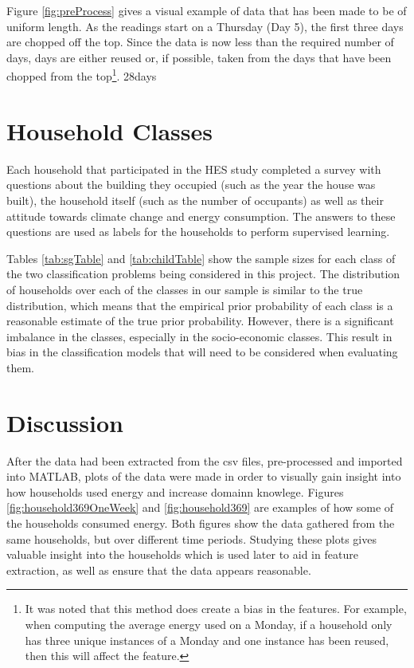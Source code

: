 Figure \ref{fig:preProcess} gives a visual example of data that has been made to be of uniform length. As the readings start on a Thursday (Day 5), the first three days are chopped off the top. Since the data is now less than the required number of days, days are either reused or, if possible, taken from the days that have been chopped from the top\footnote{It was noted that this method does create a bias in the features. For example, when computing the average energy used on a Monday, if a household only has three unique instances of a Monday and one instance has been reused, then this will affect the feature.}.
\to28days

\section{Household Classes}

Each household that participated in the HES study completed a survey with questions about the building  they occupied (such as the year the house was built), the household itself (such as the number of occupants) as well as their attitude towards climate change and energy consumption. The answers to these questions are used as labels for the households to perform supervised learning.

\sgTable

Tables \ref{tab:sgTable} and \ref{tab:childTable} show the sample sizes for each class of the two classification problems being considered in this project. The distribution of households over each of the classes in our sample is similar to the true distribution, which means that the empirical prior probability of each class is a reasonable estimate of the true prior probability. However, there is a significant imbalance in the classes, especially in the socio-economic classes. This result in bias in the classification models that will need to be considered when evaluating them.
\childTable

\section{Discussion}

After the data had been extracted from the csv files, pre-processed and imported into MATLAB, plots of the data were made in order to visually gain insight into how households used energy and increase domainn knowlege. Figures \ref{fig:household369OneWeek} and \ref{fig:household369} are examples of how some of the households consumed energy. Both figures show the data gathered from the same households, but over different time periods. Studying these plots gives valuable insight into the households which is used later to aid in feature extraction, as well as ensure that the data appears reasonable. 

